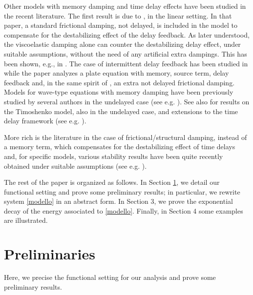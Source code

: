 \documentclass[11pt]{article}
\begin{document}
Other models with memory damping and time delay effects have been studied in the recent literature. The first result is due to \cite{KSH}, in the linear setting. In that paper, a standard frictional damping, not delayed, is included in the model to compensate for the destabilizing effect of the delay feedback. As later understood, the viscoelastic damping alone can counter the destabilizing delay effect, under suitable assumptions, without the need of any artificial extra dampings. This has been shown, e.g., in \cite{ANP, Dai, Guesmia, Yang}. The case of intermittent delay feedback has been studied in \cite{P} while the paper \cite{MustafaKafini}
  analyzes a plate equation with memory, source term, delay feedback and, in the same spirit of \cite{KSH}, an extra not delayed frictional damping. Models for wave-type equations with memory damping have been previously studied by several authors in the undelayed case (see e.g.  \cite{Alabau, ACS, CCM}). See also  \cite{A} for results on the Timoshenko model, also in the undelayed case, and extensions to the time delay framework (see e.g. \cite{SS, AM}).


More rich is the literature in the case of frictional/structural damping, instead of a memory term, which compensates for the destabilizing effect of time delays and, for specific models, various stability results have been quite recently obtained under suitable assumptions (see e.g. \cite{AABM, AG, AM, C, CFP, NP, OO, KPFirst, Capistrano, Pignotti24,  XYL}). 




The rest of the paper is organized as follows. In Section \ref{Preli}, we detail our functional setting and prove  some preliminary results; in particular, we rewrite system \eqref{modello} in an abstract form. In Section 3, we prove the exponential decay of the energy associated to \eqref{modello}. Finally, in Section 4 some examples are illustrated.


\section{Preliminaries}\label{Preli}

\setcounter{equation}{0}

Here, we precise the functional setting for our analysis and prove some preliminary results.
\end{document}
